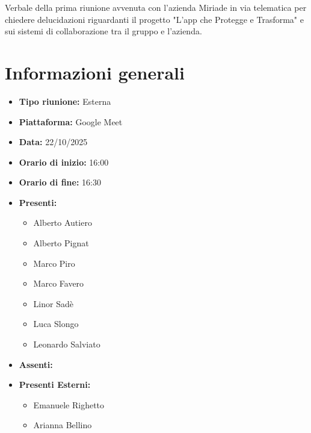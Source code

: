 \documentclass[a4paper,12pt]{article}
\begin{document}
\begin{center}
\begin{tcolorbox}[colback=secondaryblue!10,colframe=secondaryblue,width=0.9\textwidth,arc=3mm,boxrule=0.8pt,title={\bfseries Abstract}]
Verbale della prima riunione avvenuta con l'azienda Miriade in via telematica per chiedere delucidazioni riguardanti il progetto "L'app che Protegge e Trasforma" e sui sistemi di collaborazione tra il gruppo e l'azienda.
\end{tcolorbox}
\end{center}

\newpage

\tableofcontents
\newpage


\section{Informazioni generali}

\begin{itemize}
    \item \textbf{Tipo riunione:} Esterna
    \item \textbf{Piattaforma:} Google Meet
    \item \textbf{Data:} 22/10/2025
    \item \textbf{Orario di inizio:} 16:00
    \item \textbf{Orario di fine:} 16:30
    \item \textbf{Presenti:}
    \begin{itemize}[leftmargin=1.5em, itemsep=3pt, label={\rule[0.5ex]{0.4em}{0.4em}}]
        \item Alberto Autiero
        \item Alberto Pignat
        \item Marco Piro
        \item Marco Favero
        \item Linor Sadè
        \item Luca Slongo
        \item Leonardo Salviato
    \end{itemize}
    \item \textbf{Assenti:}
    \item \textbf{Presenti Esterni:}
    \begin{itemize}[leftmargin=1.5em, itemsep=3pt, label={\rule[0.5ex]{0.4em}{0.4em}}]
        \item Emanuele Righetto
        \item Arianna Bellino
    \end{itemize}

\end{itemize}
\end{document}
